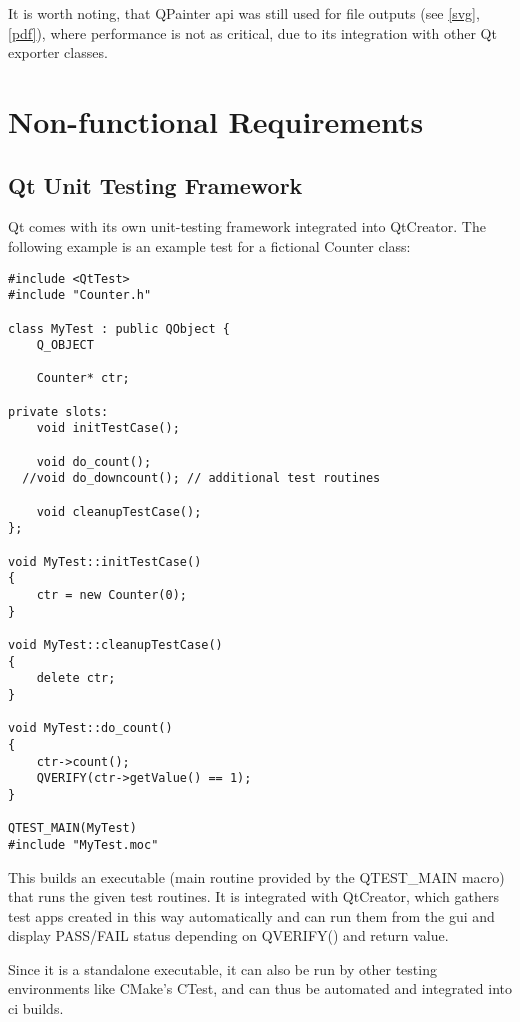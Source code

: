 It is worth noting, that QPainter \gls{api} was still used for file outputs (see \ref{svg}, \ref{pdf}), where performance is not as critical, due to its integration with other Qt exporter classes.

\section{Non-functional Requirements}

\subsection{Qt Unit Testing Framework}

Qt comes with its own unit-testing framework integrated into QtCreator. The following example is an example test for a fictional Counter class:

\begin{lstlisting}
#include <QtTest>
#include "Counter.h"

class MyTest : public QObject {
    Q_OBJECT

    Counter* ctr;

private slots:
    void initTestCase();

    void do_count();
  //void do_downcount(); // additional test routines

    void cleanupTestCase();
};

void MyTest::initTestCase()
{
	ctr = new Counter(0);
}

void MyTest::cleanupTestCase()
{
    delete ctr;
}

void MyTest::do_count()
{
	ctr->count();
	QVERIFY(ctr->getValue() == 1);
}

QTEST_MAIN(MyTest)
#include "MyTest.moc"
\end{lstlisting}

This builds an executable (main routine provided by the QTEST\_MAIN macro) that runs the given test routines.
It is integrated with QtCreator, which gathers test apps created in this way automatically and can run them from the \gls{gui} and display PASS/FAIL status depending on QVERIFY() and return value.
\begin{figure}[h]
\end{figure}

Since it is a standalone executable, it can also be run by other testing environments like CMake's CTest, and can thus be automated and integrated into \gls{ci} builds.

\begin{figure}[h]
\end{figure}

